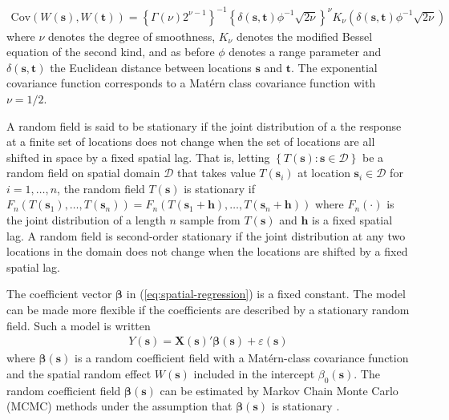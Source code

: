\documentclass[authoryear, review, 11pt]{elsarticle}
\begin{document}
\begin{align}\label{eq:matern-covarinace}
    \text{Cov}(W(\bm{s}), W(\bm{t})) = \left\{\Gamma(\nu) 2^{\nu-1} \right\}^{-1} \left\{\delta(\bm{s}, \bm{t}) \phi^{-1}\sqrt{2\nu}\right\}^\nu K_{\nu} \left(\delta(\bm{s}, \bm{t}) \phi^{-1}\sqrt{2\nu}\right)
    \end{align}
where $\nu$ denotes the degree of smoothness, $K_{\nu}$ denotes the modified Bessel equation of the second kind, and as before $\phi$ denotes a range parameter and $\delta(\bm{s}, \bm{t})$ the Euclidean distance between locations $\bm{s}$ and $\bm{t}$. The exponential covariance function corresponds to a Mat\'{e}rn class covariance function with $\nu = 1/2$.

	A random field is said to be stationary if the joint distribution of a the response at a finite set of locations does not change when the set of locations are all shifted in space by a fixed spatial lag. That is, letting $\left\{T(\bm{s}) : \bm{s} \in \mathcal{D}\right\}$ be a random field on spatial domain $\mathcal{D}$ that takes value $T(\bm{s}_i)$ at location $\bm{s}_i \in \mathcal{D}$ for $i = 1, \dots, n$, the random field $T(\bm{s})$ is stationary if $F_n\left(T(\bm{s}_1), \dots, T(\bm{s}_n)\right) = F_n\left(T(\bm{s}_1+\bm{h}), \dots, T(\bm{s}_n+\bm{h})\right)$ where $F_n(\cdot)$ is the joint distribution of a length $n$ sample from $T(\bm{s})$ and $\bm{h}$ is a fixed spatial lag. A random field is second-order stationary if the joint distribution at any two locations in the domain does not change when the locations are shifted by a fixed spatial lag.
	
	The coefficient vector $\bm{\beta}$ in (\ref{eq:spatial-regression}) is a fixed constant. The model can be made more flexible if the coefficients are described by a stationary random field. Such a model is written
\begin{align}\label{eq:SVCR-process}
    Y(\bm{s}) = \bm{X}(\bm{s})'\bm{\beta}(\bm{s}) + \varepsilon(\bm{s})
\end{align}
	where $\bm{\beta}(\bm{s})$ is a random coefficient field with a Mat\'{e}rn-class covariance function and the spatial random effect $W(\bm{s})$ included in the intercept $\beta_0(\bm{s})$. The random coefficient field $\bm{\beta}(\bm{s})$ can be estimated by Markov Chain Monte Carlo (MCMC) methods under the assumption that $\bm{\beta}(\bm{s})$ is stationary \citep{Gelfand:2003}.

\end{document}
